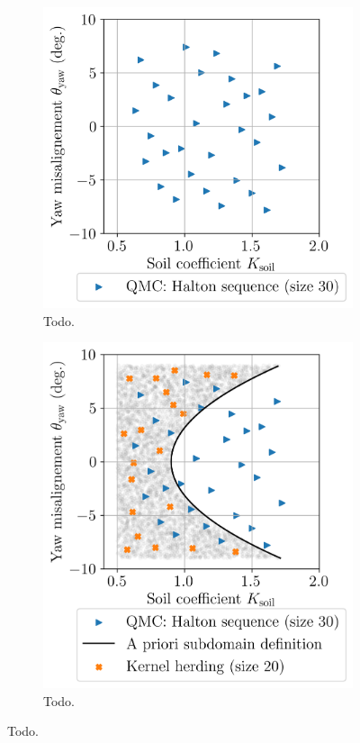 \begin{figure}
    \centering
    \begin{subfigure}{0.48\linewidth}
        \vskip -30pt
        \includegraphics[width=\linewidth]{./part3/figures/OWT/initial_halton.png}
        \caption{Todo.}
    \end{subfigure}
    \begin{subfigure}{0.48\linewidth}
        \includegraphics[width=\linewidth]{./part3/figures/OWT/initial_composite.png}
        \caption{Todo.}
    \end{subfigure}
    \label{fig:inital_doe}
    \caption{Todo.}
\end{figure}

